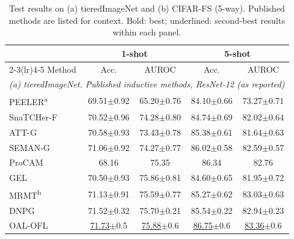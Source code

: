 \begin{table}[tbp]
\centering
\footnotesize
\setlength{\tabcolsep}{4pt}
\caption{Test results on (a) tieredImageNet and (b) CIFAR-FS (5-way). Published methods are listed for context. Bold: best; underlined: second-best results within each panel.}\label{tab:tiered-cifar}
\begin{tabular}{lcccc}
\toprule
 & \multicolumn{2}{c}{1-shot} & \multicolumn{2}{c}{5-shot} \\
\cmidrule(lr){2-3}\cmidrule(lr){4-5}
Method & Acc. & AUROC & Acc. & AUROC \\
\midrule
\multicolumn{5}{l}{\textit{(a) tieredImageNet. Published inductive methods, ResNet-12 (as reported)}} \\
PEELER\textsuperscript{a}~\cite{liu2020peeler} & 69.51{\scriptsize$\pm$0.92} & 65.20{\scriptsize$\pm$0.76} & 84.10{\scriptsize$\pm$0.66} & 73.27{\scriptsize$\pm$0.71} \\
SnaTCHer-F~\cite{jeong2021snatcher} & 70.52{\scriptsize$\pm$0.96} & 74.28{\scriptsize$\pm$0.80} & 84.74{\scriptsize$\pm$0.69} & 82.02{\scriptsize$\pm$0.64} \\
ATT-G~\cite{huang2022tane} & 70.58{\scriptsize$\pm$0.93} & 73.43{\scriptsize$\pm$0.78} & 85.38{\scriptsize$\pm$0.61} & 81.64{\scriptsize$\pm$0.63} \\
SEMAN-G~\cite{huang2022tane} & 71.06{\scriptsize$\pm$0.92} & 74.27{\scriptsize$\pm$0.77} & 86.02{\scriptsize$\pm$0.58} & 82.59{\scriptsize$\pm$0.57} \\
ProCAM~\cite{song2022procam} & 68.16 & 75.35 & 86.34 & 82.76 \\
GEL~\cite{wang2023gel} & 70.50{\scriptsize$\pm$0.93} & 75.86{\scriptsize$\pm$0.81} & 84.60{\scriptsize$\pm$0.65} & 81.95{\scriptsize$\pm$0.72} \\
MRMT\textsuperscript{b}~\cite{che2023mrm} & 71.13{\scriptsize$\pm$0.91} & 75.59{\scriptsize$\pm$0.77} & 85.27{\scriptsize$\pm$0.62} & 83.03{\scriptsize$\pm$0.63} \\
DNPG~\cite{zhang2024dnpg} & 71.52{\scriptsize$\pm$0.32} & 75.70{\scriptsize$\pm$0.21} & 85.54{\scriptsize$\pm$0.22} & 82.94{\scriptsize$\pm$0.23} \\
OAL-OFL~\cite{kim2025oalofl} & \underline{71.73}{\scriptsize$\pm$0.5} & \underline{75.88}{\scriptsize$\pm$0.6} & \underline{86.75}{\scriptsize$\pm$0.6} & \underline{83.36}{\scriptsize$\pm$0.6} \\

\end{tabular}
\end{table}
